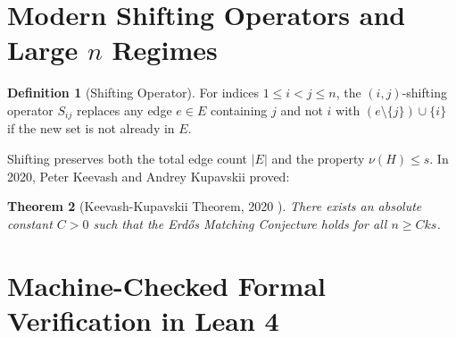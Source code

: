 \documentclass[11pt,a4paper]{article}
\newtheorem{theorem}{Theorem}[section]
\theoremstyle{definition}
\newtheorem{definition}[theorem]{Definition}
\begin{document}
\section{Modern Shifting Operators and Large $n$ Regimes}

\begin{definition}[Shifting Operator]\label{def:shift}
For indices $1 \le i < j \le n$, the $(i, j)$-shifting operator $S_{ij}$ replaces any edge $e \in E$ containing $j$ and not $i$ with $(e \setminus \{j\}) \cup \{i\}$ if the new set is not already in $E$.
\end{definition}

Shifting preserves both the total edge count $|E|$ and the property $\nu(H) \le s$.
In 2020, Peter Keevash and Andrey Kupavskii \cite{keevash2020matching} proved:

\begin{theorem}[Keevash-Kupavskii Theorem, 2020 \cite{keevash2020matching}]\label{thm:keevash}
There exists an absolute constant $C > 0$ such that the Erd\H{o}s Matching Conjecture holds for all $n \ge C k s$.
\end{theorem}

\section{Machine-Checked Formal Verification in Lean 4}
\end{document}
